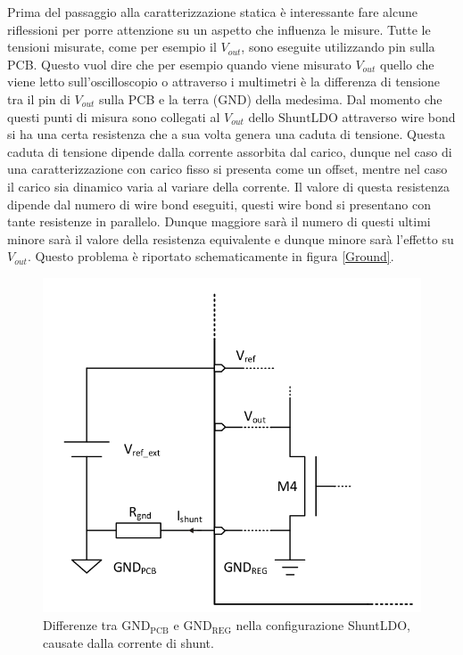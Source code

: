 Prima del passaggio alla caratterizzazione statica è interessante fare alcune riflessioni per porre attenzione su un aspetto che influenza le misure. 
Tutte le tensioni misurate, come per esempio il $V_{out}$, sono eseguite utilizzando pin sulla PCB. Questo vuol dire che per esempio quando viene misurato $V_{out}$ quello che viene letto sull'oscilloscopio o attraverso i multimetri è la differenza di tensione tra il pin di $V_{out}$ sulla PCB e la terra (GND) della medesima. Dal momento che questi punti di misura sono collegati al $V_{out}$ dello $\mathrm{ShuntLDO}$ attraverso wire bond si ha una certa resistenza che a sua volta genera una caduta di tensione. Questa caduta di tensione dipende dalla corrente assorbita dal carico, dunque nel caso di una caratterizzazione con carico fisso si presenta come un offset, mentre nel caso il carico sia dinamico varia al variare della corrente. 
Il valore di questa resistenza dipende dal numero di wire bond eseguiti, questi wire bond si presentano con tante resistenze in parallelo. Dunque maggiore sarà il numero di questi ultimi minore sarà il valore della resistenza equivalente e dunque minore sarà l'effetto su $V_{out}$. Questo problema è riportato schematicamente in figura \ref{Ground}.

\begin{figure}
\centering
\includegraphics[scale=.3]{Immagini/Ground}
\caption{Differenze tra $\mathrm{GND_{PCB}}$ e $\mathrm{GND_{REG}}$ nella configurazione ShuntLDO, causate dalla corrente di shunt.}
\label{SLDO2Astatic}
\end{figure}

